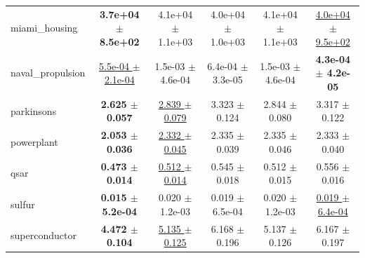 \begin{table}[!htbp]
{\begin{tabular}{lccccc}
miami\_housing & \textbf{3.7e+04 $\pm$ 8.5e+02} & 4.1e+04 $\pm$ 1.1e+03 & 4.0e+04 $\pm$ 1.0e+03 & 4.1e+04 $\pm$ 1.1e+03 & \underline{4.0e+04 $\pm$ 9.5e+02} \\
naval\_propulsion & \underline{5.5e-04 $\pm$ 2.1e-04} & 1.5e-03 $\pm$ 4.6e-04 & 6.4e-04 $\pm$ 3.3e-05 & 1.5e-03 $\pm$ 4.6e-04 & \textbf{4.3e-04 $\pm$ 4.2e-05} \\
parkinsons & \textbf{2.625 $\pm$ 0.057} & \underline{2.839 $\pm$ 0.079} & 3.323 $\pm$ 0.124 & 2.844 $\pm$ 0.080 & 3.317 $\pm$ 0.122 \\
powerplant & \textbf{2.053 $\pm$ 0.036} & \underline{2.332 $\pm$ 0.045} & 2.335 $\pm$ 0.039 & 2.335 $\pm$ 0.046 & 2.333 $\pm$ 0.040 \\
qsar & \textbf{0.473 $\pm$ 0.014} & \underline{0.512 $\pm$ 0.014} & 0.545 $\pm$ 0.018 & 0.512 $\pm$ 0.015 & 0.556 $\pm$ 0.016 \\
sulfur & \textbf{0.015 $\pm$ 5.2e-04} & 0.020 $\pm$ 1.2e-03 & 0.019 $\pm$ 6.5e-04 & 0.020 $\pm$ 1.2e-03 & \underline{0.019 $\pm$ 6.4e-04} \\
superconductor & \textbf{4.472 $\pm$ 0.104} & \underline{5.135 $\pm$ 0.125} & 6.168 $\pm$ 0.196 & 5.137 $\pm$ 0.126 & 6.167 $\pm$ 0.197 \\
\bottomrule
\end{tabular}
}
\end{table}